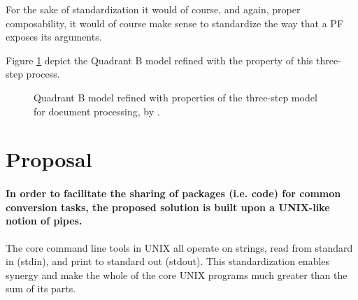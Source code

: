 \documentclass{scrreprt}
\begin{document}
For the sake of standardization it would of course, and again, proper composability, it would of course make sense to standardize the way that a PF exposes its arguments.

Figure \ref{fig:quad-b-with-three-step-process} depict the Quadrant B model refined with the property of this three-step process.

\begin{figure}[h]
  \centering


  \caption{Quadrant B model refined with properties of the three-step model for document processing, by \citet{goldfarb}.}
  \label{fig:quad-b-with-three-step-process}
\end{figure}













%
%

\color{black}
\section{Proposal}

\paragraph{In order to facilitate the sharing of packages (i.e. code) for common conversion tasks, the proposed solution is built upon a UNIX-like notion of pipes.}  The core command line tools in UNIX all operate on strings, read from standard in (stdin), and print to standard out (stdout). This standardization enables synergy and make the whole of the core UNIX programs much greater than the sum of its parts.
\end{document}

